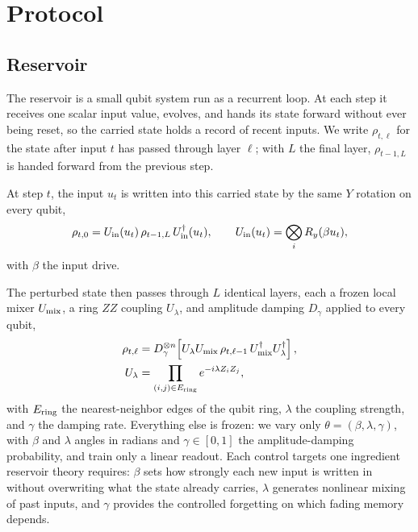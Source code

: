 \documentclass[10pt,conference]{IEEEtran}
\begin{document}
\section{Protocol}

\subsection{Reservoir}
The reservoir is a small qubit system run as a recurrent loop. At each step it receives one scalar input value, evolves, and hands its state forward without ever being reset, so the carried state holds a record of recent inputs. We write $\rho_{t,\ell}$ for the state after input $t$ has passed through layer $\ell$; with $L$ the final layer, $\rho_{t-1,L}$ is handed forward from the previous step.

At step $t$, the input $u_t$ is written into this carried state by the same $Y$ rotation on every qubit,
\begin{equation}
\rho_{t,0}=U_{\rm in}(u_t)\,\rho_{t-1,L}\,U_{\rm in}^\dagger(u_t),
\qquad U_{\rm in}(u_t)=\bigotimes_i R_y(\beta u_t),
\end{equation}
with $\beta$ the input drive.

The perturbed state then passes through $L$ identical layers, each a frozen local mixer $U_{\rm mix}$, a ring $ZZ$ coupling $U_\lambda$, and amplitude damping $D_\gamma$ applied to every qubit,
\begin{equation}
\begin{aligned}
\rho_{t,\ell}
&=D_\gamma^{\otimes n}\!\left[U_\lambda U_{\rm mix}\,\rho_{t,\ell-1}\,U_{\rm mix}^\dagger U_\lambda^\dagger\right],\\
U_\lambda
&=\prod_{(i,j)\in E_{\rm ring}} e^{-i\lambda Z_iZ_j},
\end{aligned}
\end{equation}
with $E_{\rm ring}$ the nearest-neighbor edges of the qubit ring, $\lambda$ the coupling strength, and $\gamma$ the damping rate. Everything else is frozen: we vary only $\theta=(\beta,\lambda,\gamma)$, with $\beta$ and $\lambda$ angles in radians and $\gamma\in[0,1]$ the amplitude-damping probability, and train only a linear readout. Each control targets one ingredient reservoir theory requires: $\beta$ sets how strongly each new input is written in without overwriting what the state already carries, $\lambda$ generates nonlinear mixing of past inputs, and $\gamma$ provides the controlled forgetting on which fading memory depends.
\end{document}
